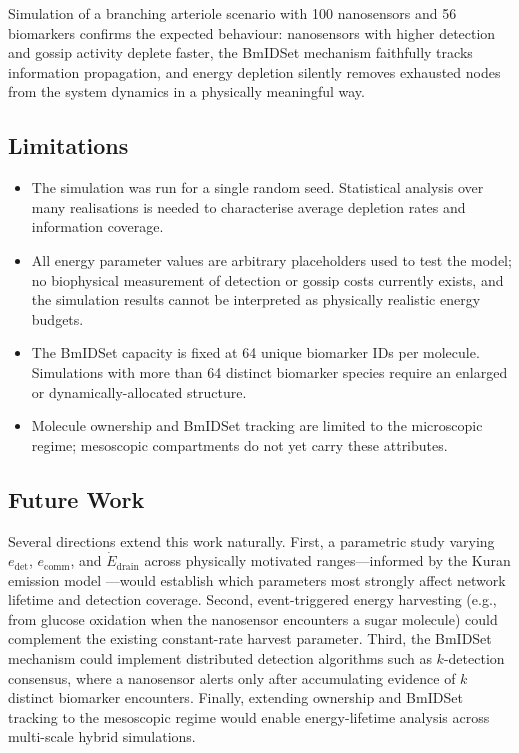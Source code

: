 \documentclass[journal]{IEEEtran}
\begin{document}
Simulation of a branching arteriole scenario with 100 nanosensors and 56
biomarkers confirms the expected behaviour: nanosensors with higher detection
and gossip activity deplete faster, the BmIDSet mechanism faithfully tracks
information propagation, and energy depletion silently removes exhausted nodes
from the system dynamics in a physically meaningful way.

\subsection{Limitations}

\begin{itemize}
  \item The simulation was run for a single random seed. Statistical analysis
        over many realisations is needed to characterise average depletion rates
        and information coverage.
  \item All energy parameter values are arbitrary placeholders used to test
        the model; no biophysical measurement of detection or gossip costs
        currently exists, and the simulation results cannot be interpreted as
        physically realistic energy budgets.
  \item The BmIDSet capacity is fixed at 64 unique biomarker IDs per molecule.
        Simulations with more than 64 distinct biomarker species require an
        enlarged or dynamically-allocated structure.
  \item Molecule ownership and BmIDSet tracking are limited to the microscopic
        regime; mesoscopic compartments do not yet carry these attributes.
\end{itemize}

\subsection{Future Work}

Several directions extend this work naturally. First, a parametric study
varying $e_\mathrm{det}$, $e_\mathrm{comm}$, and $\dot{E}_\mathrm{drain}$
across physically motivated ranges---informed by the Kuran emission model
\cite{kuran2010energy}---would establish which parameters most strongly affect
network lifetime and detection coverage. Second, event-triggered energy
harvesting (e.g., from glucose oxidation when the nanosensor encounters a
sugar molecule) could complement the existing constant-rate harvest parameter.
Third, the BmIDSet mechanism could implement distributed detection algorithms
such as $k$-detection consensus, where a nanosensor alerts only after
accumulating evidence of $k$ distinct biomarker encounters. Finally, extending
ownership and BmIDSet tracking to the mesoscopic regime would enable
energy-lifetime analysis across multi-scale hybrid simulations.
\end{document}
